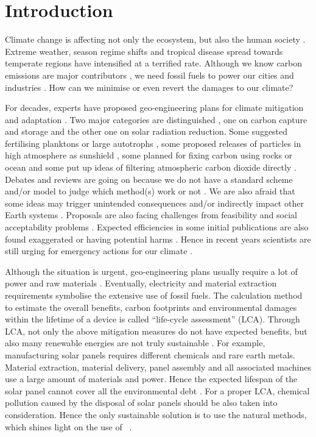 \documentclass[../thesis.tex]{subfiles} %
\begin{document}
\section{Introduction}

Climate change is affecting not only the ecosystem, but also the human society \autocite{notz2016observed,schuur2015climate}.  Extreme weather, season regime shifts and tropical disease spread towards temperate regions have intensified at a terrified rate.  Although we know carbon emissions are major contributors \autocite{notz2016observed}, we need fossil fuels to power our cities and industries \autocite{ferguson2000electricity}.  How can we minimise or even revert the damages to our climate?

For decades, experts have proposed geo-engineering plans for climate mitigation and adaptation \autocite{farrelly2013carbon,yang2008progress}.  Two major categories are distinguished \autocite{}, one on carbon capture and storage and the other one on solar radiation reduction.  Some suggested fertilising planktons \autocite{} or large autotrophs \autocite{}, some proposed releases of particles in high atmosphere as sunshield \autocite{}, some planned for fixing carbon using rocks \autocite{} or ocean \autocite{} and some put up ideas of filtering atmospheric carbon dioxide directly \autocite{}.  Debates and reviews are going on because we do not have a standard scheme and/or model to judge which method(s) work or not \autocite{}.  We are also afraid that some ideas may trigger unintended consequences \autocite{} and/or indirectly impact other Earth systems \autocite{}.  Proposals are also facing challenges from feasibility and social acceptability problems \autocite{}.  Expected efficiencies in some initial publications are also found exaggerated \autocite{} or having potential harms \autocite{}.  Hence in recent years scientists are still urging for emergency actions for our climate \autocite{}.

Although the situation is urgent, geo-engineering plans usually require a lot of power and raw materials \autocite{}.  Eventually, electricity and material extraction requirements symbolise the extensive use of fossil fuels.  The calculation method to estimate the overall benefits, carbon footprints and environmental damages within the lifetime of a device is called ``life-cycle assessment” (LCA).  Through LCA, not only the above mitigation measures do not have expected benefits, but also many renewable energies are not truly sustainable \autocite{abdussalam2020green}.  For example, manufacturing solar panels requires different chemicals and rare earth metals.  Material extraction, material delivery, panel assembly and all associated machines use a large amount of materials and power.  Hence the expected lifespan of the solar panel cannot cover all the environmental debt \autocite{martinopoulos2020rooftop}.  For a proper LCA, chemical pollution caused by the disposal of solar panels should be also taken into consideration.  Hence the only sustainable solution is to use the natural methods, which shines light on the use of \phy\ \autocite{farrelly2013carbon}.
\end{document}
